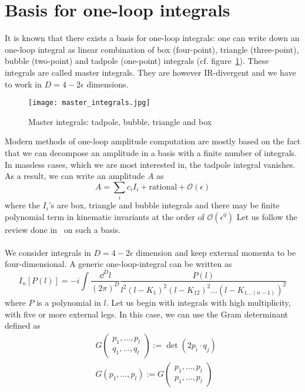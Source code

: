 \section{Basis for one-loop integrals} 
It is known that there exists a basis for one-loop integrals: one can write down an one-loop integral as linear combination of box (four-point), triangle (three-point), bubble (two-point) and tadpole (one-point) integrals (cf. figure~\ref{fig-mi}).
These integrals are called master integrals. 
They are however IR-divergent and we have to work in $D=4-2\epsilon$ dimensions.
\begin{figure}[h]
  \centering
  \texttt{[image: master\_integrals.jpg]}
  \caption{Master integrals: tadpole, bubble, triangle and box}
  \label{fig-mi}
\end{figure}
Modern methods of one-loop amplitude computation are mostly based on the fact that we can decompose an amplitude in a basis with a finite number of integrals.
In massless cases, which we are most interested in, the tadpole integral vanishes. 
As a result, we can write an amplitude $A$ as
\begin{equation}\label{master_equation}
A = \sum_i c_i I_i + \mathrm{rational} + \mathcal{O}(\epsilon)
\end{equation}
where the $I_i$'s are box, triangle and bubble integrals and there may be finite polynomial term in kinematic invariants at the order of $\mathcal{O}(\epsilon^0)$
Let us follow the review done in~\cite{Gluza:2010ws} on such a basis.
\\\\
We consider integrals in $D= 4-2\epsilon$ dimension and keep external momenta to be four-dimensional.
A generic one-loop-integral can be written as
\begin{equation}\label{generic_loop_int}
I_n[P(l)] = 
-i\int\frac{\dd^D l}{(2\pi)^D}\frac{P(l)}{l^2(l-K_1)^2(l-K_{12})^2\ldots(l-K_{1\ldots (n-1)})^2}
\end{equation}
where $P$ is a polynomial in $l$.
Let us begin with integrals with high multiplicity, with five or more external legs.
In this case, we can use the Gram determinant defined as
\begin{equation}
\begin{split}
& G\begin{pmatrix}
p_1,\ldots, p_l \\
q_1,\ldots, q_l 
\end{pmatrix}
:= \det(2p_i\cdot q_j)
\\
& G(p_1, \ldots , p_l) := G\begin{pmatrix}
p_1,\ldots, p_l \\
p_1,\ldots, p_l 
\end{pmatrix}
\end{split}
\end{equation} 
